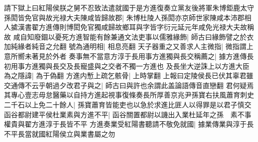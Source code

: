 請下獄上曰紅陽侯朕之舅不忍致法遣就國于是方進復奏立黨友後將軍朱博鉅鹿太守孫閎皆免官與故光禄大夫陳咸皆歸故郡|{
	朱博杜陵人孫閎亦京師世家陳咸本沛郡相人㨿漢書翟方進傳則博閎免官獨咸歸故鄉耳與字皆字衍元延元年咸免光禄大夫故稱故}
咸自知廢錮以憂死方進智能有餘兼通文法吏事以儒雅緣飾|{
	師古曰緣飾譬之於衣加純緣者純音之允翻}
號為通明相|{
	相息亮翻}
天子器重之又善求人主微指|{
	微指謂上意所嚮未著見於外者}
奏事無不當意方淳于長用事方進獨與長交稱薦之|{
	據方進傳長初用事方進獨與長交及長寵盛與之交者不獨一方進也}
及長坐大逆誅上以方進大臣為之隱諱|{
	為于偽翻}
方進内慙上疏乞骸骨|{
	上時掌翻}
上報曰定陵侯長已伏其辜君雖交通傳不云乎朝過夕改君子與之|{
	師古曰與許也余謂此盖論語傳音直戀翻}
君何疑焉其專心壹志毋怠醫藥以自持方進起視事復條奏長所厚善京兆尹孫寶右扶風蕭育刺史二千石以上免二十餘人|{
	孫寶蕭育皆能吏也以急於求進比匪人以得罪是以君子慎交}
函谷都尉建平侯杜業素與方進不平|{
	函谷關置都尉以譏出入業杜延年之孫　素不事權貴與翟方進淳于長皆不平}
方進奏業受紅陽書聽請不敬免就國|{
	據業傳業與淳于長不平長當就國紅陽侯立與業書屬之勿}


